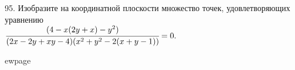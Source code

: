 95. Изобразите на координатной плоскости множество точек, удовлетворяющих уравнению \\ $\cfrac{(4-x(2y+x)-y^2)}{(2x-2y+xy-4)(x^2+y^2-2(x+y-1))}=0.$

ewpage
